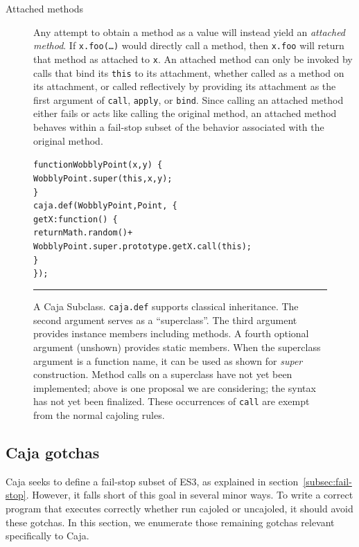 \documentclass[letterpaper,twocolumn,10pt]{article}
\newcommand{\code}[1]{{\tt {#1}}}              %
\begin{document}
\begin{description}
   \item[Attached methods] Any attempt to obtain a method as a value will 
   instead yield an \emph{attached method}. If \code{x.foo(\ldots)} would 
   directly call a method, then \code{x.foo} will return that method as 
   attached to \code{x}. 
   An attached method can only be invoked by calls that bind its \code{this} 
   to its attachment, whether called as a method on its attachment, or called 
   reflectively by providing its attachment as the first argument of 
   \code{call}, \code{apply}, or \code{bind}. Since calling an attached 
   method either fails or acts like calling the original method, an attached 
   method behaves within a fail-stop subset of the behavior associated with the original method.
  
\end{description}

\begin{figure}[t!]
\begin{alltt}
function WobblyPoint(x, y)\ \{
  WobblyPoint.super(this, x, y);
\}
caja.def(WobblyPoint, Point,\ \{
  getX: function()\ \{ 
    return Math.random() +
      WobblyPoint.super.prototype.getX.call(this); 
  \}
\});
\end{alltt}

\caption[A Caja Subclass.]{A Caja Subclass. \code{caja.def} supports 
classical inheritance. The second argument serves as a ``superclass''. The 
third argument provides instance members including methods. A fourth optional 
argument (unshown) provides static members. When the superclass argument is a 
function name, it can be used as shown for \emph{super} construction.
Method calls on a superclass have not yet been implemented; above is one proposal we are 
considering; the syntax has not yet been finalized. 
These occurrences of \code{call} are exempt from the normal 
cajoling rules. \\ } \hrule
\label{fig:caja-subclass}
\end{figure}


\subsection{Caja gotchas}
\label{subsec:caja-gotchas}

Caja seeks to define a fail-stop subset of ES3, as explained in section~\ref{subsec:fail-stop}. However, 
it falls short of this goal in several minor ways. To write a correct program 
that executes correctly whether run cajoled or uncajoled, it should 
avoid these gotchas. In this section, we enumerate those remaining gotchas
relevant specifically to Caja.
\end{document}
